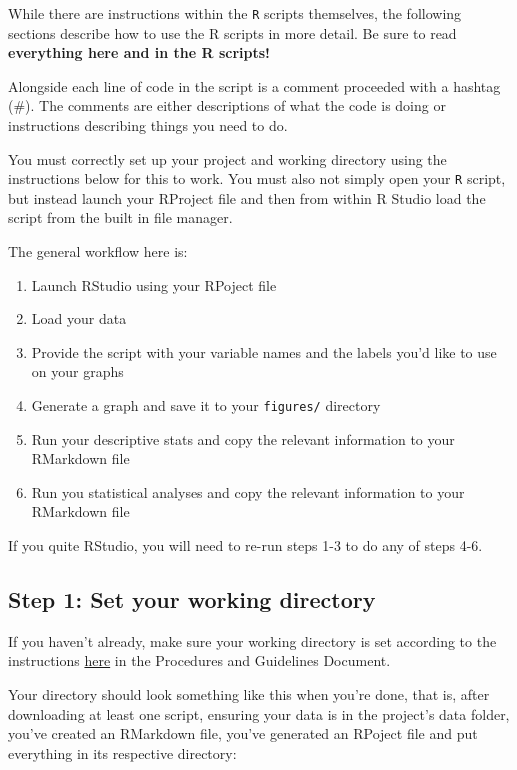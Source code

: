 \documentclass[
]{book}
\providecommand{\tightlist}{%
  \setlength{\itemsep}{0pt}\setlength{\parskip}{0pt}}
\begin{document}
While there are instructions within the \texttt{R} scripts themselves, the following sections describe how to use the R scripts in more detail. Be sure to read \textbf{everything here and in the R scripts!}

Alongside each line of code in the script is a comment proceeded with a hashtag (\#). The comments are either descriptions of what the code is doing or instructions describing things you need to do.

You must correctly set up your project and working directory using the instructions below for this to work. You must also not simply open your \texttt{R} script, but instead launch your RProject file and then from within R Studio load the script from the built in file manager.

The general workflow here is:

\begin{enumerate}
\def\labelenumi{\arabic{enumi}.}
\tightlist
\item
  Launch RStudio using your RPoject file
\item
  Load your data
\item
  Provide the script with your variable names and the labels you'd like to use on your graphs
\item
  Generate a graph and save it to your \texttt{figures/} directory
\item
  Run your descriptive stats and copy the relevant information to your RMarkdown file
\item
  Run you statistical analyses and copy the relevant information to your RMarkdown file
\end{enumerate}

If you quite RStudio, you will need to re-run steps 1-3 to do any of steps 4-6.

\hypertarget{step-1-set-your-working-directory}{%
\subsection*{Step 1: Set your working directory}\label{step-1-set-your-working-directory}}

If you haven't already, make sure your working directory is set according to the instructions \href{https://ubco-biology.github.io/Procedures-and-Guidelines/set-a-working-directory-in-rstudio.html}{here} in the Procedures and Guidelines Document.

Your directory should look something like this when you're done, that is, after downloading at least one script, ensuring your data is in the project's data folder, you've created an RMarkdown file, you've generated an RPoject file and put everything in its respective directory:
\end{document}
